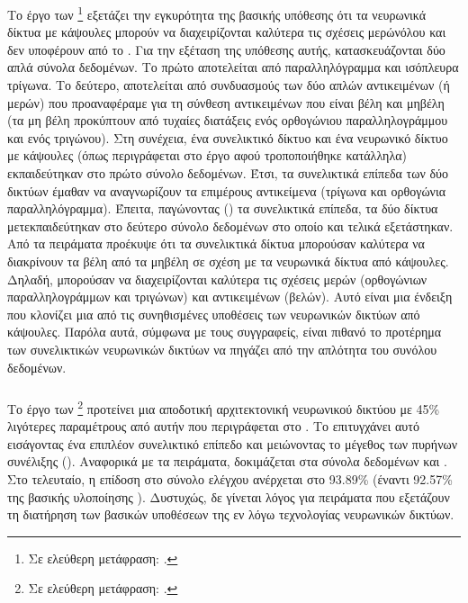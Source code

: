 Το έργο των  \footnote{Σε ελεύθερη μετάφραση: .} \cite{manogaran2020capsnet} εξετάζει την εγκυρότητα της βασικής υπόθεσης ότι τα νευρωνικά δίκτυα με κάψουλες μπορούν να διαχειρίζονται καλύτερα τις σχέσεις μερών\textendash όλου και δεν υποφέρουν από το . Για την εξέταση της υπόθεσης αυτής, κατασκευάζονται δύο απλά σύνολα δεδομένων. Το πρώτο αποτελείται από παραλληλόγραμμα και ισόπλευρα τρίγωνα. Το δεύτερο, αποτελείται από συνδυασμούς των δύο απλών αντικειμένων (ή μερών) που προαναφέραμε για τη σύνθεση αντικειμένων που είναι βέλη και μη\textendash βέλη (τα μη βέλη προκύπτουν από τυχαίες διατάξεις ενός ορθογώνιου παραλληλογράμμου και ενός τριγώνου). Στη συνέχεια, ένα συνελικτικό δίκτυο και ένα νευρωνικό δίκτυο με κάψουλες (όπως περιγράφεται στο έργο \cite{sabour2017dynamic} αφού τροποποιήθηκε κατάλληλα) εκπαιδεύτηκαν στο πρώτο σύνολο δεδομένων. Έτσι, τα συνελικτικά επίπεδα των δύο δικτύων έμαθαν να αναγνωρίζουν τα επιμέρους αντικείμενα (τρίγωνα και ορθογώνια παραλληλόγραμμα). Έπειτα, παγώνοντας () τα συνελικτικά επίπεδα, τα δύο δίκτυα μετεκπαιδεύτηκαν στο δεύτερο σύνολο δεδομένων στο οποίο και τελικά εξετάστηκαν. Από τα πειράματα προέκυψε ότι τα συνελικτικά δίκτυα μπορούσαν καλύτερα να διακρίνουν τα βέλη από τα μη\textendash βέλη σε σχέση με τα νευρωνικά δίκτυα από κάψουλες. Δηλαδή, μπορούσαν να διαχειρίζονται καλύτερα τις σχέσεις μερών (ορθογώνιων παραλληλογράμμων και τριγώνων) και αντικειμένων (βελών). Αυτό είναι μια ένδειξη που κλονίζει μια από τις συνηθισμένες υποθέσεις των νευρωνικών δικτύων από κάψουλες. Παρόλα αυτά, σύμφωνα με τους συγγραφείς, είναι πιθανό το προτέρημα των συνελικτικών νευρωνικών δικτύων να πηγάζει από την απλότητα του συνόλου δεδομένων.


\subsubsection{}

Το έργο των  \footnote{Σε ελεύθερη μετάφραση: .} \cite{luo2019r} προτείνει μια αποδοτική αρχιτεκτονική νευρωνικού δικτύου με 45\% λιγότερες παραμέτρους από αυτήν που περιγράφεται στο \cite{sabour2017dynamic}. Το επιτυγχάνει αυτό εισάγοντας ένα επιπλέον συνελικτικό επίπεδο και μειώνοντας το μέγεθος των πυρήνων συνέλιξης (). Αναφορικά με τα πειράματα, δοκιμάζεται στα σύνολα δεδομένων  και . Στο τελευταίο, η επίδοση στο σύνολο ελέγχου ανέρχεται στο 93.89\% (έναντι 92.57\% της βασικής υλοποίησης \cite{sabour2017dynamic}). Δυστυχώς, δε γίνεται λόγος για πειράματα που εξετάζουν τη διατήρηση των βασικών υποθέσεων της εν λόγω τεχνολογίας νευρωνικών δικτύων.

